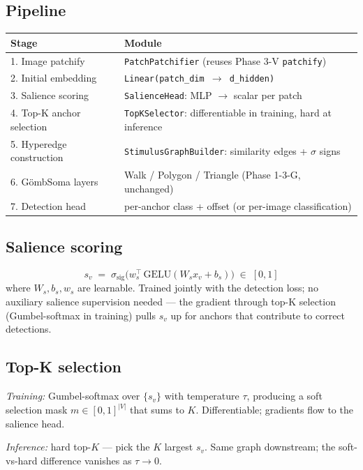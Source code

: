 \documentclass[11pt,a4paper]{article}
\newcommand{\sig}{\ensuremath{\sigma}}
\newcommand{\Soma}{G\"ombSoma}
\begin{document}
\subsection{Pipeline}

\begin{center}
\begin{tabular}{ll}
\toprule
Stage & Module \\
\midrule
1. Image patchify        & \texttt{PatchPatchifier} (reuses Phase 3-V \texttt{patchify}) \\
2. Initial embedding     & \texttt{Linear(patch\_dim $\to$ d\_hidden)} \\
3. Salience scoring      & \texttt{SalienceHead}: MLP $\to$ scalar per patch \\
4. Top-K anchor selection & \texttt{TopKSelector}: differentiable in training, hard at inference \\
5. Hyperedge construction & \texttt{StimulusGraphBuilder}: similarity edges + $\sig$ signs \\
6. \Soma{} layers         & Walk / Polygon / Triangle (Phase 1-3-G, unchanged) \\
7. Detection head        & per-anchor class + offset (or per-image classification) \\
\bottomrule
\end{tabular}
\end{center}

\subsection{Salience scoring}

\[
s_v \;=\; \sigma_\text{sig}\!\bigl( w_s^\top \, \text{GELU}(W_s x_v + b_s) \bigr) \;\in\; [0, 1]
\]
where $W_s, b_s, w_s$ are learnable. Trained jointly with the
detection loss; no auxiliary salience supervision needed --- the
gradient through top-K selection (Gumbel-softmax in training) pulls
$s_v$ up for anchors that contribute to correct detections.

\subsection{Top-K selection}

\emph{Training:} Gumbel-softmax over $\{s_v\}$ with temperature
$\tau$, producing a soft selection mask $m \in [0, 1]^{|V|}$ that
sums to $K$. Differentiable; gradients flow to the salience head.

\emph{Inference:} hard top-$K$ — pick the $K$ largest $s_v$. Same
graph downstream; the soft-vs-hard difference vanishes as $\tau \to 0$.
\end{document}
